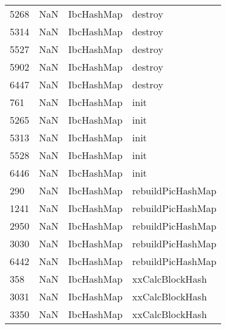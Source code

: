 \begin{tabular}{llll}
5268 &                   NaN &                 IbcHashMap &                                   destroy \\
5314 &                   NaN &                 IbcHashMap &                                   destroy \\
5527 &                   NaN &                 IbcHashMap &                                   destroy \\
5902 &                   NaN &                 IbcHashMap &                                   destroy \\
6447 &                   NaN &                 IbcHashMap &                                   destroy \\
761  &                   NaN &                 IbcHashMap &                                      init \\
5265 &                   NaN &                 IbcHashMap &                                      init \\
5313 &                   NaN &                 IbcHashMap &                                      init \\
5528 &                   NaN &                 IbcHashMap &                                      init \\
6446 &                   NaN &                 IbcHashMap &                                      init \\
290  &                   NaN &                 IbcHashMap &                         rebuildPicHashMap \\
1241 &                   NaN &                 IbcHashMap &                         rebuildPicHashMap \\
2950 &                   NaN &                 IbcHashMap &                         rebuildPicHashMap \\
3030 &                   NaN &                 IbcHashMap &                         rebuildPicHashMap \\
6442 &                   NaN &                 IbcHashMap &                         rebuildPicHashMap \\
358  &                   NaN &                 IbcHashMap &                           xxCalcBlockHash \\
3031 &                   NaN &                 IbcHashMap &                           xxCalcBlockHash \\
3350 &                   NaN &                 IbcHashMap &                           xxCalcBlockHash \\

\end{tabular}
